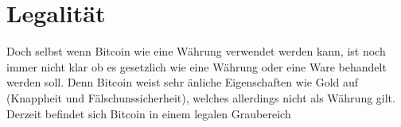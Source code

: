 \section{Legalität}

Doch selbst wenn Bitcoin wie eine Währung verwendet werden kann, ist noch immer nicht klar ob es gesetzlich wie eine Währung oder eine Ware behandelt werden soll.
Denn Bitcoin weist sehr änliche Eigenschaften wie Gold auf (Knappheit und Fälschunssicherheit), welches allerdings nicht als Währung gilt.
Derzeit befindet sich Bitcoin in einem legalen Graubereich
